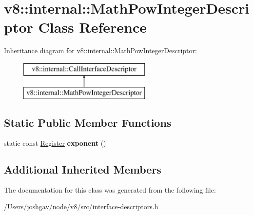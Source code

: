 \hypertarget{classv8_1_1internal_1_1_math_pow_integer_descriptor}{}\section{v8\+:\+:internal\+:\+:Math\+Pow\+Integer\+Descriptor Class Reference}
\label{classv8_1_1internal_1_1_math_pow_integer_descriptor}
Inheritance diagram for v8\+:\+:internal\+:\+:Math\+Pow\+Integer\+Descriptor\+:\begin{figure}[H]
\begin{center}
\leavevmode
\includegraphics[height=2.000000cm]{classv8_1_1internal_1_1_math_pow_integer_descriptor}
\end{center}
\end{figure}
\subsection*{Static Public Member Functions}
\begin{DoxyCompactItemize}
\item 
static const \hyperlink{structv8_1_1internal_1_1_register}{Register} {\bfseries exponent} ()\hypertarget{classv8_1_1internal_1_1_math_pow_integer_descriptor_aae9be0c5348614a4ba2dacb8a7b7bc81}{}\label{classv8_1_1internal_1_1_math_pow_integer_descriptor_aae9be0c5348614a4ba2dacb8a7b7bc81}

\end{DoxyCompactItemize}
\subsection*{Additional Inherited Members}


The documentation for this class was generated from the following file\+:\begin{DoxyCompactItemize}
\item 
/\+Users/joshgav/node/v8/src/interface-\/descriptors.\+h\end{DoxyCompactItemize}
